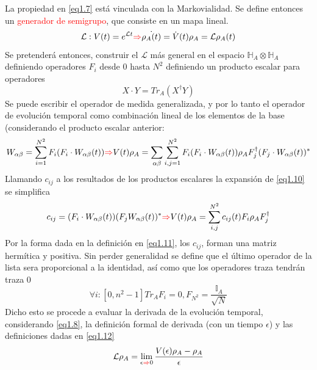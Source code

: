 \documentclass{book}
\begin{document}
La propiedad en \textcolor{blue}{\ref{eq1.7}} está vinculada con la Markovialidad.
Se define entonces un \textcolor{Red}{generador de semigrupo}, que consiste en un mapa lineal.
\begin{equation}\label{eq1.8}\mathcal{L}:V(t)=e^{\mathcal{L}t}\textcolor{red}{\Rightarrow} \dot{\rho_A(t)}=\dot{V}(t)\rho_A=\mathcal{L}\rho_A(t)\end{equation}
Se pretenderá entonces, construir el $\mathcal{L}$ más general en el espacio $\mathbb{H}_A\otimes\mathbb{H}_A$ definiendo operadores $F_i$ desde $0$ hasta $N^2$ definiendo un producto escalar para operadores
\begin{equation}\label{eq1.9}  X\cdot Y=Tr_A(X^\dag Y)\end{equation}
Se puede escribir el operador de medida generalizada, y por lo tanto el operador de evolución temporal como combinación lineal de los elementos de la base (considerando el producto escalar anterior:
\begin{equation}\label{eq1.10}W_{\alpha\beta}=\sum_{i=1}^{N^2} F_i(F_i\cdot W_{\alpha\beta}(t))\textcolor{red}{\Rightarrow} V(t)\rho_A=\sum_{\alpha\beta}\sum_{i,j=1}^{N^2} F_i(F_i\cdot W_{\alpha\beta}(t))\rho_AF_j^\dag(F_j\cdot W_{\alpha\beta}(t))^*\end{equation}
Llamando $c_{ij}$ a los resultados de los productos escalares la expansión de \textcolor{blue}{\ref{eq1.10}} se simplifica
\begin{equation}\label{eq1.11}c_{ij}=(F_i\cdot W_{\alpha\beta}(t))(F_j W_{\alpha\beta}(t))^*\textcolor{red}{\Rightarrow} V(t)\rho_A=\sum_{i,j}^{N^2}c_{ij}(t)F_i\rho_AF_j^\dag\end{equation}
Por la forma dada en la definición en \textcolor{blue}{\ref{eq1.11}}, los $c_{ij}$, forman una matriz hermítica y positiva.
Sin perder generalidad se define que el último operador de la lista sera proporcional a la identidad, así como que los operadores traza tendrán traza $0$
\begin{equation}\label{eq1.12}\forall i:[0,n^2-1] Tr_A F_i=0, F_{N^2}=\frac{\mathbb{I}_A}{\sqrt{N}}\end{equation}
Dicho esto se procede a evaluar la derivada de la evolución temporal, considerando \textcolor{blue}{\ref{eq1.8}}, la definición formal de derivada (con un tiempo $\epsilon$) y las definiciones dadas en \textcolor{blue}{\ref{eq1.12}}
\begin{equation}\label{eq1.13}\mathcal{L}\rho_A= \lim\limits_{\epsilon\textcolor{red}{\Rightarrow} 0}\frac{V(\epsilon)\rho_A-\rho_A}{\epsilon}\end{equation}
\end{document}
